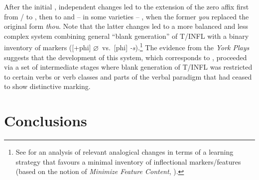 \documentclass[output=paper]{langsci/langscibook}
\begin{document}
After the initial , independent changes led to the extension of the
zero affix first from \Fpl/\Spl{} to \Tpl{}, then to \Fsg{} and – in some varieties –
\Ssg{}, when the former \Spl{} \emph{you} replaced the original \Ssg{} form
\emph{thou}. Note that the latter changes led to a more balanced and less
complex  system combining general ``blank generation'' of T/INFL with
a binary inventory of  markers ([+phi] $\varnothing$\ vs.\ [\textminus phi]
\emph{-s}).\footnote{See \textcite{Fuss:2010} for an analysis of relevant analogical
    changes in terms of a learning strategy that favours a minimal inventory of
    inflectional markers/features (based on the notion of \emph{Minimize Feature
Content}, \citealt{Halle:1997}).} The evidence from the \emph{York Plays}
suggests that the development of this system, which corresponds to , proceeded via a set of intermediate stages where blank generation of
T/INFL was restricted to certain verbs or verb classes and parts of the verbal
paradigm that had ceased to show distinctive  marking.

\section{Conclusions}\label{sec:10.summary}
\end{document}
